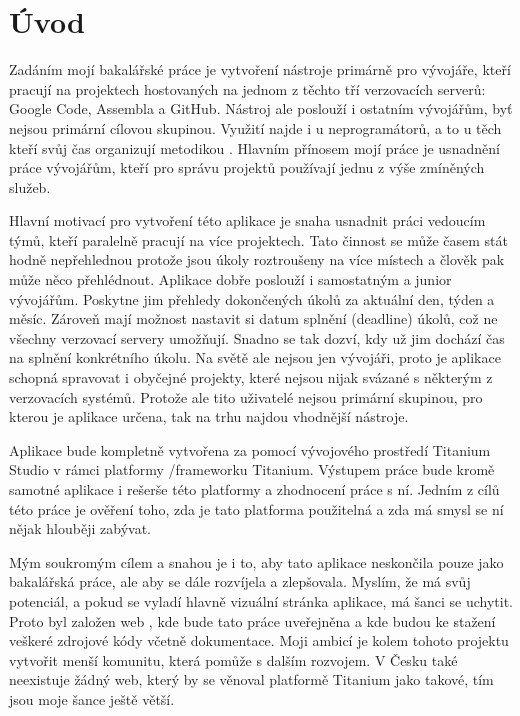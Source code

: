 \chapter{Úvod}

Zadáním mojí bakalářské práce je vytvoření nástroje primárně pro vývojáře, kteří pracují na projektech hostovaných na jednom z těchto tří verzovacích serverů: Google Code\cite{gcode}, Assembla\cite{assembla} a GitHub\cite{github}. Nástroj ale poslouží i ostatním vývojářům, byť nejsou primární cílovou skupinou. Využití najde i u neprogramátorů, a to u těch kteří svůj čas organizují metodikou \cite{gtd:web}. Hlavním přínosem mojí práce je usnadnění práce vývojářům, kteří pro správu projektů používají jednu z výše zmíněných služeb. 

Hlavní motivací pro vytvoření této aplikace je snaha usnadnit práci vedoucím týmů, kteří paralelně pracují na více projektech. Tato činnost se může časem stát hodně nepřehlednou protože jsou úkoly roztroušeny na více místech a člověk pak může něco přehlédnout. Aplikace dobře poslouží i samostatným a junior vývojářům. Poskytne jim přehledy dokončených úkolů za aktuální den, týden a měsíc. Zároveň mají možnost nastavit si datum splnění (deadline) úkolů, což ne všechny verzovací servery umožňují. Snadno se tak dozví, kdy už jim dochází čas na splnění konkrétního úkolu. Na světě ale nejsou jen vývojáři, proto je aplikace schopná spravovat i obyčejné projekty, které nejsou nijak svázané s některým z verzovacích systémů. Protože ale tito uživatelé nejsou primární skupinou, pro kterou je aplikace určena, tak na trhu najdou vhodnější nástroje.

Aplikace bude kompletně vytvořena za pomocí vývojového prostředí Titanium Studio\cite{titanium} v rámci platformy \slash frameworku Titanium. Výstupem práce bude kromě samotné aplikace i rešerše této platformy a zhodnocení práce s ní. Jedním z cílů této práce je ověření toho, zda je tato platforma použitelná a zda má smysl se ní nějak hlouběji zabývat.

Mým soukromým cílem a snahou je i to, aby tato aplikace neskončila pouze jako bakalářská práce, ale aby se dále rozvíjela a zlepšovala. Myslím, že má svůj potenciál, a pokud se vyladí hlavně vizuální stránka aplikace, má šanci se uchytit. Proto byl založen web \cite{gtdtoolweb}, kde bude tato práce uveřejněna a kde budou ke stažení veškeré zdrojové kódy včetně dokumentace. Moji ambicí je kolem tohoto projektu vytvořit menší komunitu, která pomůže s dalším rozvojem. V Česku také neexistuje žádný web, který by se věnoval platformě Titanium jako takové, tím jsou moje šance ještě větší.